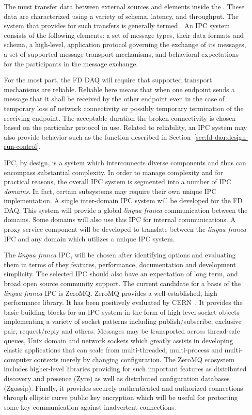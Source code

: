 The  must transfer data between external sources and elements inside the . 
These data are characterized using a variety of schema, latency, and throughput. 
The system that provides for such transfers is generally termed .
An IPC system consists of the following elements:
a set of message types, their data formats and schema,
a high-level, application protocol governing the exchange of its messages,
a set of supported message transport mechanisms, and
behavioral expectations for the participants in the message exchange. 


For the most part, the FD DAQ will require that supported transport mechanisms are reliable. 
Reliable here means that when one endpoint sends a message that it shall be received by the other endpoint even in the case of temporary loss of network connectivity or possibly temporary termination of the receiving endpoint.
The acceptable duration the broken connectivity is chosen based on the particular protocol in use.
Related to reliability, an IPC system may also provide behavior such as the  function described in Section~\ref{sec:fd-daq:design-run-control}.

IPC, by design, is a system which interconnects diverse components and thus can encompass substantial complexity. 
In order to manage complexity and for practical reasons, the overall IPC system is segmented into a number of IPC \textit{domains}. 
In fact, certain  subsystems may require their own unique IPC implementation.
A single inter-domain IPC system will be developed for the FD DAQ. 
This system will provide a global \textit{lingua franca} communication between the domains. 
Some domains will also use this IPC for internal communications. 
A proxy service component will be developed to translate between the \textit{lingua franca} IPC and any domain which utilizes a unique IPC system.

The \textit{lingua franca} IPC, will be chosen after identifying options and evaluating them in terms of they features, performance, documentation and development simplicity. 
The selected IPC should also have an expectation of long term, and broad open source community support. 
The current candidate for a basis of the \textit{lingua franca} IPC is ZeroMQ. 
ZeroMQ provides a well established, high performance library. 
It has been positively evaluated by CERN~\cite{cern-zeromq}. 
It provides the basic building blocks for an IPC system in the form of high-level socket objects implementing a variety of socket patterns including publish/subscribe, exclusive pair, request/reply and others. 
Messages may be transported across thread-safe queues, Unix domain and network sockets which greatly assists in developing elastic applications that can scale from multi-threaded, multi-process and multi-computer contexts merely by changing configuration. 
The ZeroMQ ecosystem includes higher-level libraries providing for such important features as distributed discovery and presence (Zyre) as well as distributed configuration databases (Zgossip). 
Finally, it provides securely authenticated and authorized connections through elliptic curve public key encryption which will be useful for protecting some key communication against inadvertent connections.

